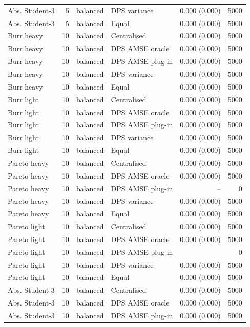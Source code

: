 \begin{tabular}{lrllrr}
Abs. Student-3 & 5 & balanced & DPS variance & 0.000 (0.000) & 5000 \\
Abs. Student-3 & 5 & balanced & Equal & 0.000 (0.000) & 5000 \\
Burr heavy & 10 & balanced & Centralised & 0.000 (0.000) & 5000 \\
Burr heavy & 10 & balanced & DPS AMSE oracle & 0.000 (0.000) & 5000 \\
Burr heavy & 10 & balanced & DPS AMSE plug-in & 0.000 (0.000) & 5000 \\
Burr heavy & 10 & balanced & DPS variance & 0.000 (0.000) & 5000 \\
Burr heavy & 10 & balanced & Equal & 0.000 (0.000) & 5000 \\
Burr light & 10 & balanced & Centralised & 0.000 (0.000) & 5000 \\
Burr light & 10 & balanced & DPS AMSE oracle & 0.000 (0.000) & 5000 \\
Burr light & 10 & balanced & DPS AMSE plug-in & 0.000 (0.000) & 5000 \\
Burr light & 10 & balanced & DPS variance & 0.000 (0.000) & 5000 \\
Burr light & 10 & balanced & Equal & 0.000 (0.000) & 5000 \\
Pareto heavy & 10 & balanced & Centralised & 0.000 (0.000) & 5000 \\
Pareto heavy & 10 & balanced & DPS AMSE oracle & 0.000 (0.000) & 5000 \\
Pareto heavy & 10 & balanced & DPS AMSE plug-in & -- & 0 \\
Pareto heavy & 10 & balanced & DPS variance & 0.000 (0.000) & 5000 \\
Pareto heavy & 10 & balanced & Equal & 0.000 (0.000) & 5000 \\
Pareto light & 10 & balanced & Centralised & 0.000 (0.000) & 5000 \\
Pareto light & 10 & balanced & DPS AMSE oracle & 0.000 (0.000) & 5000 \\
Pareto light & 10 & balanced & DPS AMSE plug-in & -- & 0 \\
Pareto light & 10 & balanced & DPS variance & 0.000 (0.000) & 5000 \\
Pareto light & 10 & balanced & Equal & 0.000 (0.000) & 5000 \\
Abs. Student-3 & 10 & balanced & Centralised & 0.000 (0.000) & 5000 \\
Abs. Student-3 & 10 & balanced & DPS AMSE oracle & 0.000 (0.000) & 5000 \\
Abs. Student-3 & 10 & balanced & DPS AMSE plug-in & 0.000 (0.000) & 5000 \\

\end{tabular}
